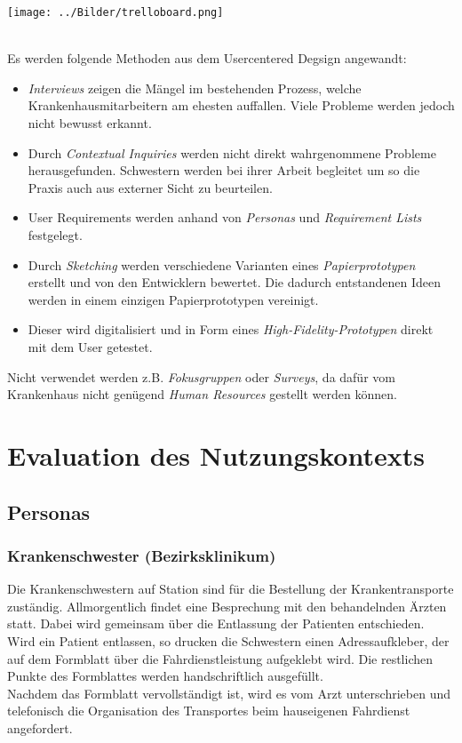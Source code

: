 \documentclass[a4paper, ngerman, 12pt]{scrartcl}
\begin{document}
\begin{minipage}{\textwidth}
	\centering
	\texttt{[image: ../Bilder/trelloboard.png]}
	\label{img:trello}
\end{minipage}\\
\newpage
Es werden folgende Methoden aus dem Usercentered Degsign angewandt:
\begin{itemize}
\item \textit{Interviews} zeigen die Mängel im bestehenden Prozess, welche Krankenhausmitarbeitern am ehesten auffallen. Viele Probleme werden jedoch nicht bewusst erkannt.
\item Durch  \textit{Contextual Inquiries} werden nicht direkt wahrgenommene Probleme herausgefunden. Schwestern werden bei ihrer Arbeit begleitet um so die Praxis auch aus externer Sicht zu beurteilen.
\item User Requirements werden anhand von  \textit{Personas} und  \textit{Requirement Lists} festgelegt.
\item Durch  \textit{Sketching} werden verschiedene Varianten eines  \textit{Papierprototypen} erstellt und von den Entwicklern bewertet. Die dadurch entstandenen Ideen werden in einem einzigen Papierprototypen vereinigt.
\item Dieser wird digitalisiert und in Form eines  \textit{High-Fidelity-Prototypen} direkt mit dem User getestet.
\end{itemize}
Nicht verwendet werden z.B.  \textit{Fokusgruppen} oder  \textit{Surveys}, da dafür vom Krankenhaus nicht genügend  \textit{Human Resources} gestellt werden können.\\

\section{Evaluation des Nutzungskontexts}
\subsection{Personas}
\subsubsection{Krankenschwester (Bezirksklinikum)	}
Die Krankenschwestern auf Station sind für die Bestellung der Krankentransporte zuständig. Allmorgentlich findet eine Besprechung mit den behandelnden Ärzten statt. Dabei wird gemeinsam über die Entlassung der Patienten entschieden. Wird ein Patient entlassen, so drucken die Schwestern einen Adressaufkleber, der auf dem Formblatt über die Fahrdienstleistung aufgeklebt wird. Die restlichen Punkte des Formblattes werden handschriftlich ausgefüllt.\\
Nachdem das Formblatt vervollständigt ist, wird es vom Arzt unterschrieben und telefonisch die Organisation des Transportes beim hauseigenen Fahrdienst angefordert.
\end{document}
